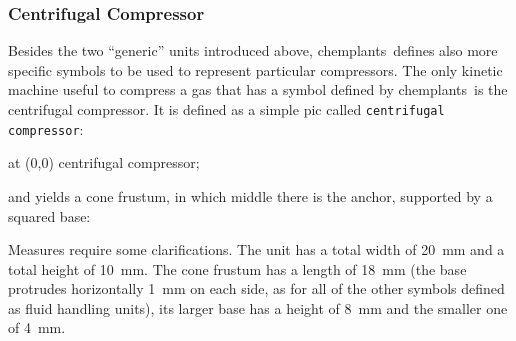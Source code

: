 \documentclass[12pt]{article}						%
\newcommand*{\chpn}[1]{\texttt{#1}}				%
\newcommand*{\chpp}[1]{\texttt{#1}}				%
\newcommand*{\chemplants}{chemplants}
\begin{document}
\subsubsection{Centrifugal Compressor}

Besides the two ``generic'' units introduced above, \chemplants\ defines also
more specific symbols to be used to represent particular compressors. The only
kinetic machine useful to compress a gas that has a symbol defined by
\chemplants\ is the centrifugal compressor. It is defined as a simple pic called
\chpp{centrifugal compressor}:
\begin{chpcode}
	\pic at (0,0) {centrifugal compressor};
\end{chpcode}
and yields a cone frustum, in which middle there is the anchor, supported by a
squared base:
\begin{center}
\end{center}

Measures require some clarifications. The unit has a total width of \SI{20}{\mm}
and a total height of \SI{10}{\mm}. The cone frustum has a length of
\SI{18}{\mm} (the base protrudes horizontally \SI{1}{\mm} on each side, as for
all of the other symbols defined as fluid handling units), its larger base has
a height of \SI{8}{\mm} and the smaller one of \SI{4}{\mm}.
\end{document}
